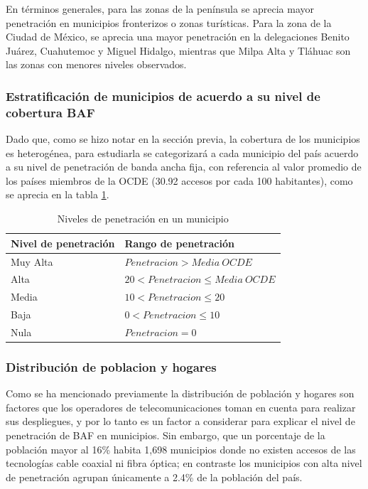 \documentclass[9pt,twocolumn,twoside]{ilcss}
\begin{document}
 En términos generales, para las zonas de la península se aprecia mayor penetración en municipios fronterizos o zonas turísticas. Para la zona de la Ciudad de México, se aprecia una mayor penetración en la delegaciones Benito Juárez, Cuahutemoc  y Miguel Hidalgo, mientras que Milpa Alta y Tláhuac son las zonas con menores niveles observados.

\subsubsection{Estratificación de municipios de acuerdo a su nivel de cobertura BAF}

Dado que, como se hizo notar en la sección previa, la cobertura de los municipios es heterogénea, para estudiarla se categorizará a cada municipio del país acuerdo a su nivel de penetración de banda ancha fija, con referencia al valor promedio de los países miembros de la OCDE (30.92 accesos por cada 100 habitantes), como se aprecia en la tabla 
\ref{table:clasifpen}.

\begin{table}[tbhp]
	\centering
	\caption{Niveles de penetración en un municipio\label{table:clasifpen}}
	\begin{tabular}{@{}ll@{}}
		\toprule
		Nivel de penetración & Rango  de penetración            \\ \midrule
		Muy Alta  & $Penetracion > Media \ OCDE$         \\ 
		Alta    & $20 < Penetracion \leq Media \ OCDE$ \\ 
		Media    & $10 < Penetracion \leq 20$  \\ 
		Baja      & $0 < Penetracion \leq 10$  \\ 
		Nula      & $Penetracion =0$            \\ \bottomrule
	\end{tabular}
\end{table}


\subsubsection{Distribución de poblacion y hogares}

Como se ha mencionado previamente la distribución de población y hogares son factores que los operadores de telecomunicaciones toman en cuenta para realizar sus despliegues, y por lo tanto es un factor a considerar para explicar el nivel de penetración de BAF en municipios. Sin embargo, que un porcentaje de la población mayor al 16\% habita 1,698 municipios donde no existen accesos de las tecnologías cable coaxial ni fibra óptica; en contraste los municipios con alta nivel de penetración agrupan únicamente a 2.4\% de la población del país.
\end{document}
